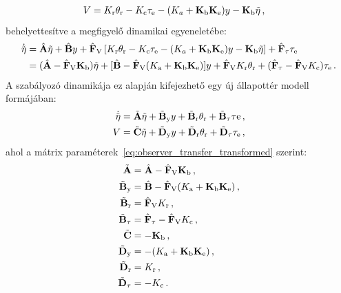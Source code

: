 \begin{equation}
    \begin{split}
        V &= K_{\mathrm{r}} \theta_{\mathrm{r}} - K_{\mathrm{c}} \tau_{\mathrm{e}} - (K_a + \mathbf{K}_{\mathrm{b}} \mathbf{K}_{\mathrm{e}}) y - \mathbf{K}_{\mathrm{b}} \tilde{\mathbf{\eta}}\,,
    \end{split}
\end{equation}
behelyettesítve a megfigyelő dinamikai egyeneletébe:
\begin{align}\label{eq:observer_transfer_transformed}
    \begin{split}
        \dot{\tilde{\mathbf{\eta}}} &= \hat{\mathbf{A}} \tilde{\mathbf{\eta}} + 
        \hat{\mathbf{B}} y + 
        \hat{\mathbf{F}}_{\mathrm{V}}\left[K_{\mathrm{r}} \theta_{\mathrm{r}} - K_{\mathrm{c}} \tau_{\mathrm{e}} - (K_a + \mathbf{K}_{\mathrm{b}} \mathbf{K}_{\mathrm{e}}) y - \mathbf{K}_{\mathrm{b}} \tilde{\mathbf{\eta}}\right] + 
        \hat{\mathbf{F}}_{\mathrm{\tau}} \tau_{\mathrm{e}} \\
        &= (\hat{\mathbf{A}} - \hat{\mathbf{F}}_{\mathrm{V}} \mathbf{K}_{\mathrm{b}})\tilde{\mathbf{\eta}} + 
        [\hat{\mathbf{B}} - \hat{\mathbf{F}}_{\mathrm{V}} (K_{\mathrm{a}} + \mathbf{K}_{\mathrm{b}} \mathbf{K}_{\mathrm{e}})]y + 
        \hat{\mathbf{F}}_{\mathrm{V}} K_{\mathrm{r}} \theta_{\mathrm{r}} + 
        (\hat{\mathbf{F}}_{\mathrm{\tau}} - \hat{\mathbf{F}}_{\mathrm{V}} K_{\mathrm{c}}) \tau_{\mathrm{e}}\,.
    \end{split}
\end{align}
A szabályozó dinamikája ez alapján kifejezhető egy új állapottér modell formájában:
\begin{align}
    \begin{split}
        \dot{\tilde{\mathbf{\eta}}} &= \tilde{\mathbf{A}}\tilde{\mathbf{\eta}} + 
        \tilde{\mathbf{B}}_{\mathrm{y}} y + 
        \tilde{\mathbf{B}}_{\mathrm{r}} \theta_{\mathrm{r}} +
        \tilde{\mathbf{B}}_{\mathrm{\tau}} \tau\mathrm{e}\,, \\
        V &= \tilde{\mathbf{C}}\tilde{\mathbf{\eta}} + 
        \tilde{\mathbf{D}}_{\mathrm{y}} y + 
        \tilde{\mathbf{D}}_{\mathrm{r}} \theta_{\mathrm{r}} + 
        \tilde{\mathbf{D}}_{\mathrm{\tau}} \tau_{\mathrm{e}}\,,
    \end{split}
\end{align}
ahol a mátrix paraméterek~\eqref{eq:observer_transfer_transformed} szerint:
\begin{align}
    \begin{split}
        \tilde{\mathbf{A}} &= \hat{\mathbf{A}} - \hat{\mathbf{F}}_{\mathrm{V}} \mathbf{K}_{\mathrm{b}}\,,\\
        \tilde{\mathbf{B}}_{\mathrm{y}} &= \hat{\mathbf{B}} - \hat{\mathbf{F}}_{\mathrm{V}} (K_{\mathrm{a}} + \mathbf{K}_{\mathrm{b}} \mathbf{K}_{\mathrm{e}})\,,\\
        \tilde{\mathbf{B}}_{\mathrm{r}} &= \hat{\mathbf{F}}_{\mathrm{V}} K_{\mathrm{r}}\,, \\
        \tilde{\mathbf{B}}_{\mathrm{\tau}} &= \hat{\mathbf{F}}_{\mathrm{\tau}} - \hat{\mathbf{F}}_{\mathrm{V}} K_{\mathrm{c}}\,, \\
        \tilde{\mathbf{C}} &= -\mathbf{K}_{\mathrm{b}}\,, \\
        \tilde{\mathbf{D}}_{\mathrm{y}} &= -(K_{\mathrm{a}} + \mathbf{K}_{\mathrm{b}} \mathbf{K}_{\mathrm{e}})\,, \\
        \tilde{\mathbf{D}}_{\mathrm{r}} &= K_{\mathrm{r}}\,, \\
        \tilde{\mathbf{D}}_{\mathrm{\tau}} &= -K_{\mathrm{c}}\,.
    \end{split}
\end{align}
